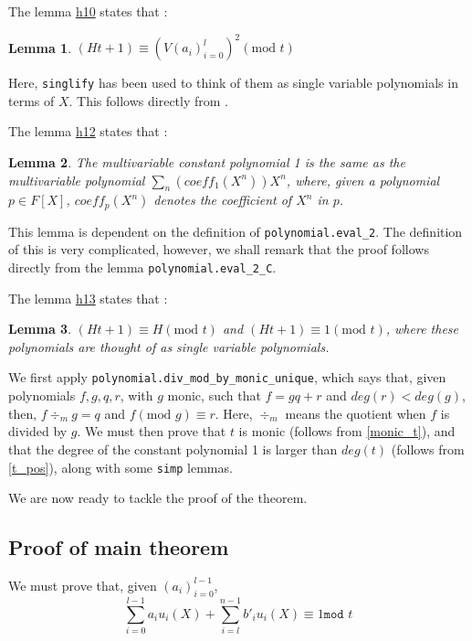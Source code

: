 \documentclass{article}
\newtheorem{lemma}{Lemma}
\theoremstyle{definition}
\theoremstyle{remark}
\begin{document}
The lemma \href{https://github.com/BoltonBailey/formal-snarks-project/blob/7fd9cd122f5887f88f6a706b4f2a68a7153c7381/src/snarks/babysnark/knowledge_soundness.lean#L438}{h10} states that :
\theoremstyle{lemma}
\begin{lemma} \label{h10}
  $ (Ht + 1) \equiv (V (a_i)_{i = 0}^{l})^2 (\text{mod }t) $
\end{lemma}
Here, \texttt{singlify} has been used to think of them as single variable polynomials in terms of $X$. This follows directly from .

The lemma \href{https://github.com/BoltonBailey/formal-snarks-project/blob/7fd9cd122f5887f88f6a706b4f2a68a7153c7381/src/snarks/babysnark/knowledge_soundness.lean#L449}{h12} states that :
\theoremstyle{lemma}
\begin{lemma} \label{h12}
  The multivariable constant polynomial 1 is the same as the multivariable polynomial $\sum_{n} (coeff_{1} (X^n)) X^n$, where, given a polynomial $p \in F[X]$, $coeff_{p} (X^n)$ denotes 
  the coefficient of $X^n$ in $p$.
\end{lemma}
This lemma is dependent on the definition of \texttt{polynomial.eval\_2}. The definition of this is very complicated, however, we shall remark that the proof follows directly from the lemma 
\texttt{polynomial.eval\_2\_C}.

The lemma \href{https://github.com/BoltonBailey/formal-snarks-project/blob/7fd9cd122f5887f88f6a706b4f2a68a7153c7381/src/snarks/babysnark/knowledge_soundness.lean#L454}{h13} states that :
\theoremstyle{lemma}
\begin{lemma} \label{h13}
  $ (Ht + 1) \equiv H (\text{mod }t) $ and $ (Ht + 1) \equiv 1 (\text{mod }t) $, where these polynomials are thought of as single variable polynomials.
\end{lemma}
We first apply \texttt{polynomial.div\_mod\_by\_monic\_unique}, which says that, given polynomials $f, g, q, r$, with $g$ monic, such that $f = g q + r$ and $deg(r) < deg (g)$, then,
$f \div_m g = q$ and $f (\text{mod }g) \equiv r$. Here, $\div_m$ means the quotient when $f$ is divided by $g$. We must then prove that $t$ is monic (follows from \ref{monic_t}), and 
that the degree of the constant polynomial 1 is larger than $deg(t)$ (follows from \ref{t_pos}), along with some \texttt{simp} lemmas.

We are now ready to tackle the proof of the theorem.

\subsection{Proof of main theorem}
We must prove that, given $(a_i)_{i = 0}^{l - 1}$,
$$ \sum_{i = 0}^{l - 1} a_i u_i(X) + \sum_{i = l}^{n - 1} b'_i u_i (X) \equiv 1 \texttt{mod } t $$
\end{document}
